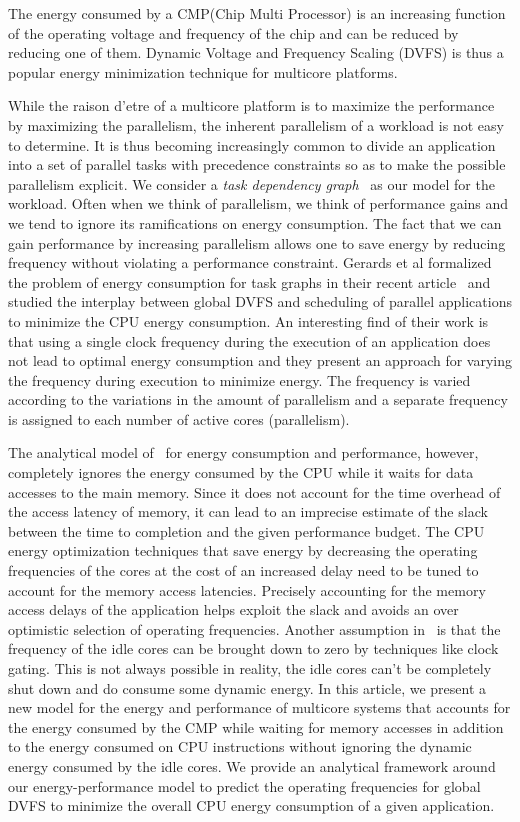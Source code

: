 \documentclass[11pt, letterpaper]{article}
\begin{document}
 The energy consumed by a CMP(Chip Multi Processor) is an increasing function of the operating voltage and frequency of the chip and can be reduced by reducing one of them. Dynamic Voltage and Frequency Scaling (DVFS) is thus a popular energy minimization technique for multicore platforms.


While the raison d'etre of a multicore platform is to maximize the performance by maximizing the parallelism, the inherent parallelism of a workload is not easy to determine. It is thus becoming increasingly common to divide an application into a set of parallel tasks with precedence constraints so as to make the possible parallelism explicit. We consider a \emph{task dependency graph}~\cite{TaskGraphs1, TaskGraphs2} as our model for the workload. Often when we think of parallelism, we think of performance gains and we tend to ignore its ramifications on energy consumption. The fact that we can gain performance by increasing parallelism allows one to save energy by reducing frequency without violating a performance constraint. Gerards et al formalized the problem of energy consumption for task graphs in their recent article~\cite{ConvexAndScheduling} and studied the interplay between global DVFS and scheduling of parallel applications to minimize the CPU energy consumption. An interesting find of their work is that using a single clock frequency during the execution of an application does not lead to optimal energy consumption and they present an approach for varying the frequency during execution to minimize energy. The frequency is varied according to the variations in the amount of parallelism and a separate frequency is assigned to each number of active cores (parallelism).

The analytical model of~\cite{ConvexAndScheduling} for energy consumption and performance, however, completely ignores the energy consumed by the CPU while it waits for data accesses to the main memory. Since it does not account for the time overhead of the access latency of memory, it can lead to an imprecise estimate of the slack between the time to completion and the given performance budget. The CPU energy optimization techniques that save energy by decreasing the operating frequencies of the cores at the cost of an increased delay need to be tuned to account for the memory access latencies. Precisely accounting for the memory access delays of the application helps exploit the slack and avoids an over optimistic selection of operating frequencies. Another assumption in~\cite{ConvexAndScheduling} is that the frequency of the idle cores can be brought down to zero by techniques like clock gating. This is not always possible in reality, the idle cores can't be completely shut down and  do consume some  dynamic energy. In this article, we present a new model for the energy and performance of multicore systems that accounts for the energy consumed by the CMP while waiting for memory accesses in addition to the energy consumed on CPU instructions without ignoring the dynamic energy consumed by the idle cores. We provide an analytical framework around our energy-performance model to predict the operating frequencies for global DVFS to minimize the overall CPU energy consumption of a given application.
\end{document}
